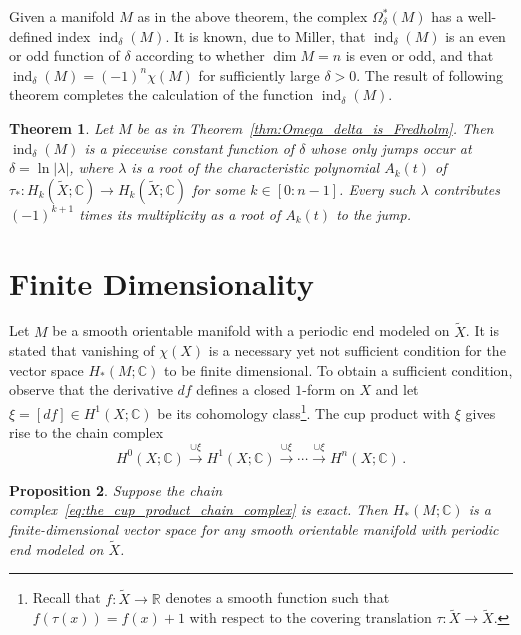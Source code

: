 \documentclass[a4paper, 12pt]{article}
\newtheorem{theorem}{Theorem}[section]
\newtheorem{proposition}[theorem]{Proposition}
\begin{document}
Given a manifold \({ M }\) as in the above theorem, the complex \({ \Omega_{\delta}^*(M) }\) has a well-defined index \({ \operatorname{ind}_{\delta}(M) }\). It is known, due to Miller, that \({ \operatorname{ind}_{\delta}(M) }\) is an even or odd function of \({ \delta }\) according to whether \({ \dim M = n }\) is even or odd, and that \({ \operatorname{ind}_{\delta}(M) = (-1)^{n} \chi(M) }\) for sufficiently large \({ \delta > 0 }\). The result of following theorem completes the calculation of the function \({ \operatorname{ind}_{\delta}(M) }\).

\begin{theorem}
    Let \({ M }\) be as in Theorem~\ref{thm:Omega_delta_is_Fredholm}. Then \({ \operatorname{ind}_{\delta}(M) }\) is a piecewise constant function of \({ \delta }\) whose only jumps occur at \({ \delta = \ln \lvert \lambda \rvert }\), where \({ \lambda }\) is a root of the char\-ac\-ter\-is\-tic polynomial \({ A_{k}(t) }\) of \({ \tau_{*} : H_{k}(\tilde X; \mathbb C) \to H_{k}(\tilde X; \mathbb C) }\) for some \({ k \in [0 : n-1] }\). Every such \({ \lambda }\) contributes \({ (-1)^{k+1} }\) times its multiplicity as a root of \({ A_{k}(t) }\) to the jump.
\end{theorem}

\section{Finite Dimensionality}

Let \({ M }\) be a smooth orientable manifold with a periodic end modeled on \({ \tilde X }\). It is stated that vanishing of \({ \chi(X) }\) is a necessary yet not sufficient condition for the vector space \({ H_{*}(M; \mathbb C) }\) to be finite dimensional. To obtain a sufficient condition, observe that the derivative \({ df }\) defines a closed \({ 1 }\)-form on \({ X }\) and let \({ \xi = [df] \in H^{1}(X; \mathbb C) }\) be its cohomology class\footnote{Recall that \({ f : \tilde X \to \mathbb R }\) denotes a smooth function such that \({ f(\tau(x)) = f(x) + 1 }\) with respect to the covering translation \({ \tau : \tilde X \to \tilde X }\).}. The cup product with \({ \xi }\) gives rise to the chain complex
\begin{equation}
    \label{eq:the_cup_product_chain_complex}
    H^{0}(X; \mathbb C) \overset{\cup \xi}{\longrightarrow} H^{1}(X; \mathbb C) \overset{\cup \xi}{\longrightarrow} \cdots \overset{\cup \xi}{\longrightarrow} H^{n}(X; \mathbb C)\,.
\end{equation}

\begin{proposition}
    Suppose the chain complex~\ref{eq:the_cup_product_chain_complex} is exact. Then \({ H_{*}(M; \mathbb C) }\) is a finite-dimensional vector space for any smooth orientable manifold with periodic end modeled on \({ \tilde X }\).
\end{proposition}
\end{document}
